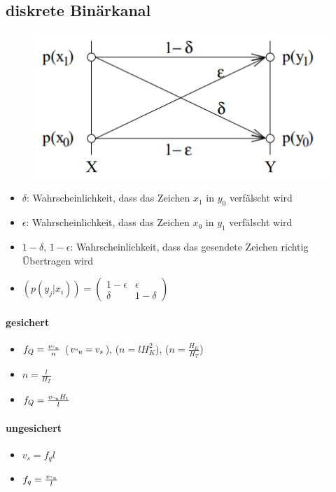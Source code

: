 \documentclass[12pt,a4paper]{article}
\begin{document}
\subsection{diskrete Binärkanal}
\begin{figure}[H]
\centering
\includegraphics[scale=0.7]{./resources/gest_bk.png}
\end{figure}
\begin{itemize}
\item $\delta$: Wahrscheinlichkeit, dass das Zeichen $x_1$ in $y_0$ verfälscht wird
\item $\epsilon$: Wahrscheinlichkeit, dass das Zeichen $x_0$ in $y_1$ verfälscht wird
\item $1-\delta$, $1-\epsilon$: Wahrscheinlichkeit, dass das gesendete Zeichen richtig Übertragen wird
\item $(p(y_j\vert x_i)) = \begin{pmatrix}
1 - \epsilon & \epsilon\\
\delta & 1-\delta
\end{pmatrix}$
\end{itemize}

\paragraph{gesichert\\}
\begin{itemize}
\item $f_Q = \frac{v_{"u}}{n}$ ($v_{"u} = v_s$), ($n = l H_K^2$), ($n = \frac{H_K}{H_T}$)
\item $n = \frac{l}{H_T}$
\item $f_Q = \frac{v_{"u}H_t}{l}$
\end{itemize}

\paragraph{ungesichert\\}
\begin{itemize}
\item $v_s = f_q l$
\item $f_q = \frac{v_{"u}}{l}$
\end{itemize}
\end{document}
